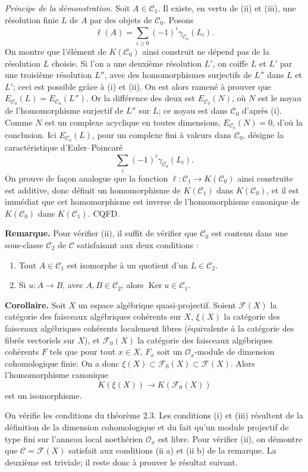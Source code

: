 \documentclass[11pt]{article}
\providecommand{\cC}{\mathcal C}
\providecommand{\cF}{\mathscr F}
\providecommand{\Ker}{\operatorname{Ker}}
\providecommand{\cO}{\mathcal O}
\begin{document}
\emph{Principe de la démonstration.} Soit $A\in\cC_1$. Il existe, en vertu de (ii) et (iii), une résolution finie $L$ de $A$ par des objets de $\cC_0$. Posons
\[
 \ell(A)=\sum_{i\geq 0}(-1)^i\gamma_{\cC_0}(L_i).
\]
On montre que l'élément de $K(\cC_0)$ ainsi construit ne dépend pas de la résolution $L$ choisie. Si l'on a une deuxième résolution $L'$, on coiffe $L$ et $L'$ par une troisième résolution $L''$, avec des homomorphismes surjectifs de $L''$ dans $L$ et $L'$; ceci est possible grâce à (i) et (ii). On est alors ramené à prouver que $E_{\cC_0}(L)=E_{\cC_0}(L'')$. Or la différence des deux est $E_{\cC_0}(N)$, où $N$ est le noyau de l'homomorphisme surjectif de $L''$ sur $L$; ce noyau est dans $\cC_0$ d'après (i). Comme $N$ est un complexe acyclique en toutes dimensions, $E_{\cC_0}(N)=0$, d'où la conclusion. Ici $E_{\cC_0}(L)$, pour un complexe fini à valeurs dans $\cC_0$, désigne la caractéristique d'Euler--Poincaré
\[
 \sum_i(-1)^i\gamma_{\cC_0}(L_i).
\]
On prouve de façon analogue que la fonction $\ell:\cC_1\to K(\cC_0)$ ainsi construite est additive, donc définit un homomorphisme de $K(\cC_1)$ dans $K(\cC_0)$, et il est immédiat que cet homomorphisme est inverse de l'homomorphisme canonique de $K(\cC_0)$ dans $K(\cC_1)$. CQFD.

\textbf{Remarque.} Pour vérifier (ii), il suffit de vérifier que $\cC_0$ est contenu dans une sous-classe $\cC_2$ de $\cC$ satisfaisant aux deux conditions :
\begin{enumerate}[label=(ii \alph*)]
\item Tout $A\in\cC_1$ est isomorphe à un quotient d'un $L\in\cC_2$.
\item Si $u:A\to B$, avec $A,B\in\cC_2$, alors $\Ker u\in\cC_1$.
\end{enumerate}

\textbf{Corollaire.} Soit $X$ un espace algébrique quasi-projectif. Soient $\cF(X)$ la catégorie des faisceaux algébriques cohérents sur $X$, $\xi(X)$ la catégorie des faisceaux algébriques cohérents localement libres (équivalente à la catégorie des fibrés vectoriels sur $X$), et $\cF_0(X)$ la catégorie des faisceaux algébriques cohérents $F$ tels que pour tout $x\in X$, $F_x$ soit un $\cO_x$-module de dimension cohomologique finie. On a donc $\xi(X)\subset\cF_0(X)\subset\cF(X)$. Alors l'homomorphisme canonique
\begin{equation}\tag{2.12}
 K(\xi(X))\longrightarrow K(\cF_0(X))
\end{equation}
est un isomorphisme.

On vérifie les conditions du théorème 2.3. Les conditions (i) et (iii) résultent de la définition de la dimension cohomologique et du fait qu'un module projectif de type fini sur l'anneau local noethérien $\cO_x$ est libre. Pour vérifier (ii), on démontre que $\cC=\cF(X)$ satisfait aux conditions (ii a) et (ii b) de la remarque. La deuxième est triviale; il reste donc à prouver le résultat suivant.
\end{document}
